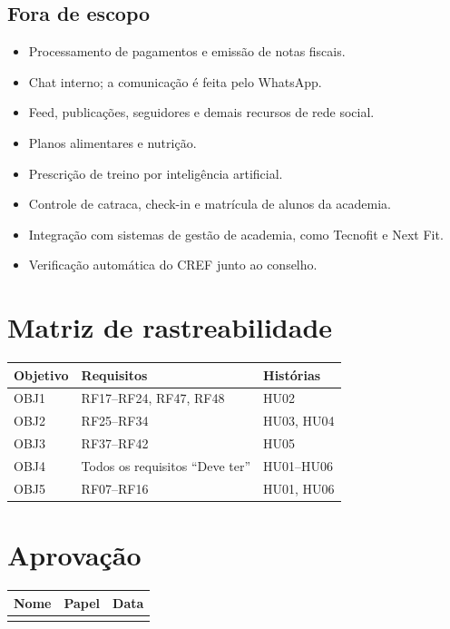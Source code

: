 \subsection{Fora de escopo}
\begin{itemize}
  \item Processamento de pagamentos e emissão de notas fiscais.
  \item Chat interno; a comunicação é feita pelo WhatsApp.
  \item Feed, publicações, seguidores e demais recursos de rede social.
  \item Planos alimentares e nutrição.
  \item Prescrição de treino por inteligência artificial.
  \item Controle de catraca, check-in e matrícula de alunos da academia.
  \item Integração com sistemas de gestão de academia, como Tecnofit e Next Fit.
  \item Verificação automática do CREF junto ao conselho.
\end{itemize}

\section{Matriz de rastreabilidade}

\begin{tabularx}{\textwidth}{@{}l L L@{}}
  \toprule
  \textbf{Objetivo} & \textbf{Requisitos} & \textbf{Histórias} \\
  \midrule
  OBJ1 & RF17--RF24, RF47, RF48 & HU02 \\
  OBJ2 & RF25--RF34 & HU03, HU04 \\
  OBJ3 & RF37--RF42 & HU05 \\
  OBJ4 & Todos os requisitos ``Deve ter'' & HU01--HU06 \\
  OBJ5 & RF07--RF16 & HU01, HU06 \\
  \bottomrule
\end{tabularx}

\section{Aprovação}

\begin{tabularx}{\textwidth}{@{}L l l@{}}
  \toprule
  \textbf{Nome} & \textbf{Papel} & \textbf{Data} \\
  \midrule
   & & \\
  \bottomrule
\end{tabularx}

